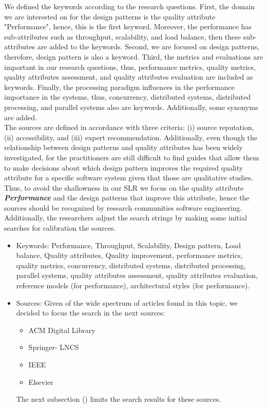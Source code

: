 We defined the keywords according to the research questions. First, the domain we are interested on for the design patterns is the quality attribute "Performance", hence, this is the first keyword. Moreover, the performance has sub-attributes such as throughput, scalability, and load balance, then these sub-attributes are added to the keywords. Second, we are focused on design patterns, therefore, design pattern is also a keyword. Third, the metrics and evaluations are important in our research questions, thus, performance metrics, quality metrics, quality attributes assessment, and quality attributes evaluation are included as keywords. Finally, the processing paradigm influences in the performance importance in the systems, thus, concurrency, distributed systems, distributed processing, and parallel systems also are keywords. Additionally, some synonyms are added.\\

The sources are defined in accordance with three criteria: (i) source reputation, (ii) accessibility, and (iii) expert recommendation. Additionally, even though the relationship between design patterns and quality attributes has been widely investigated, for the practitioners are still difficult to find guides that allow them to make decisions about which design pattern improves the required quality attribute for a specific software system given that those are qualitative studies. Thus, to avoid the shallowness in our SLR we focus on the quality attribute \textbf{\textit{Performance}} and the design patterns that improve this attribute, hence the sources should be recognized by research communities software engineering. \\

Additionally, the researchers adjust the search strings by making some initial searches for calibration  the sources.

\begin{itemize}
	\item Keywords: Performance, Throughput, Scalability, Design pattern, Load balance, Quality attributes, Quality improvement, performance metrics, quality metrics, concurrency, distributed systems, distributed processing, parallel systems, quality attributes assessment, quality attributes evaluation, reference models (for performance), architectural styles (for performance).
	
	\item Sources: Given of the wide spectrum of articles found in this topic, we decided to focus the search in the next sources:
	
	\begin{itemize}
		\item ACM Digital Library
		\item Springer- LNCS
		\item IEEE
		\item Elsevier
	\end{itemize}
	
	The next subsection () limits the search results for these sources.
	
	\label{enum2}
	
\end{itemize}

